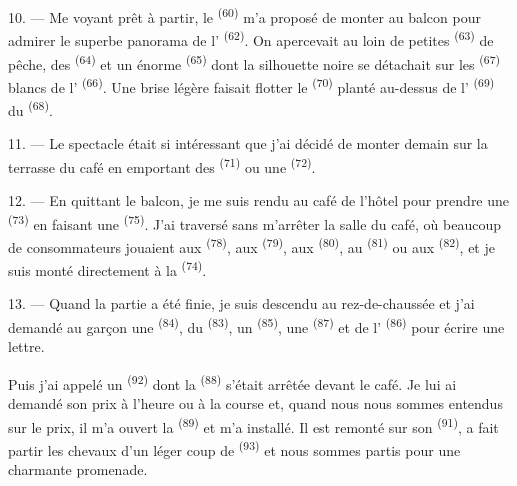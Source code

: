 10. --- Me voyant prêt à partir, le  \textsuperscript{(60)} m'a
proposé de monter au balcon pour admirer le superbe panorama de l'
\textsuperscript{(62)}. On apercevait au loin de petites 
\textsuperscript{(63)} de pêche, des  \textsuperscript{(64)} et
un énorme  \textsuperscript{(65)} dont la silhouette noire se
détachait sur les  \textsuperscript{(67)} blancs de
l' \textsuperscript{(66)}. Une brise légère faisait flotter le
 \textsuperscript{(70)} planté au-dessus de l'
\textsuperscript{(69)} du  \textsuperscript{(68)}.

\VUsaut{3.0mm}
\VUsaut{3.0mm}

11. --- Le spectacle était si intéressant que j'ai décidé de monter demain sur
la terrasse du café en emportant des  \textsuperscript{(71)} ou
une  \textsuperscript{(72)}.

12. --- En quittant le balcon, je me suis rendu au café de l'hôtel pour prendre
une  \textsuperscript{(73)} en faisant une  \textsuperscript{(75)}. J'ai traversé sans m'arrêter la salle du
café, où beaucoup de consommateurs jouaient aux 
\textsuperscript{(78)}, aux  \textsuperscript{(79)}, aux
 \textsuperscript{(80)}, au 
\textsuperscript{(81)} ou aux  \textsuperscript{(82)}, et je suis
monté directement à la  \textsuperscript{(74)}.

13. --- Quand la partie a été finie, je suis descendu au rez-de-chaussée et j'ai
demandé au garçon une  \textsuperscript{(84)}, du
 \textsuperscript{(83)}, un 
\textsuperscript{(85)}, une  \textsuperscript{(87)} et de
l' \textsuperscript{(86)} pour écrire une lettre.

Puis j'ai appelé un  \textsuperscript{(92)} dont la
 \textsuperscript{(88)} s'était arrêtée devant le café. Je lui
ai demandé son prix à l'heure ou à la course et, quand nous nous sommes entendus
sur le prix, il m'a ouvert la  \textsuperscript{(89)} et m'a
installé. Il est remonté sur son  \textsuperscript{(91)}, a fait
partir les chevaux d'un léger coup de  \textsuperscript{(93)} et
nous sommes partis pour une charmante promenade.
\VUsaut{6.0mm}
\VUfilet{22mm}
